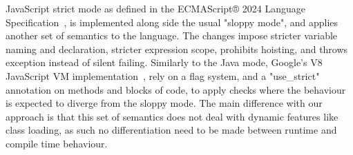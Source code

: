 JavaScript strict mode as defined in the ECMAScript® 2024 Language Specification~\cite{noauthor_ecmascript_nodate}, is implemented along side the usual 
"sloppy mode", and applies another set of semantics to the language. The changes impose stricter variable naming and declaration, 
stricter expression scope, prohibits hoisting, and throws exception instead of silent failing.
Similarly to the Java mode, Google's V8 JavaScript VM implementation~\cite{noauthor_v8_nodate}, rely on a flag system, and a "use\_strict" 
annotation on methods and blocks of code, to apply checks where the behaviour is expected to diverge from the sloppy mode. 
The main difference with our approach is that this set of semantics does not deal with dynamic features like class loading, 
as such no differentiation need to be made between runtime and compile time behaviour. 







